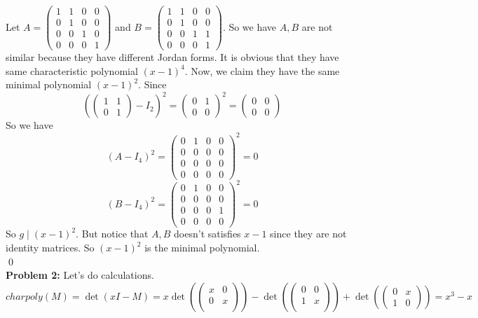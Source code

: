 \documentclass[12pt]{amsart}
\begin{document}
Let $A=\begin{pmatrix}
    1&1&0&0\\
    0&1&0&0\\
    0&0&1&0\\
    0&0&0&1
\end{pmatrix}$ and $B=\begin{pmatrix}
    1&1&0&0\\
    0&1&0&0\\
    0&0&1&1\\
    0&0&0&1
\end{pmatrix}$. So we have $A,B$ are not similar because they have different Jordan forms. It is obvious that they have same characteristic polynomial $(x-1)^4$. Now, we claim they have the same minimal polynomial $(x-1)^2$.
Since $$(\begin{pmatrix}
    1 &1\\
    0&1
\end{pmatrix}-I_2)^2=\begin{pmatrix}
    0&1\\
    0&0
\end{pmatrix}^2=\begin{pmatrix}
    0&0\\
    0&0
\end{pmatrix}$$
So we have 
\[(A-I_4)^2=\begin{pmatrix}
    0&1&0&0\\0&0&0&0\\0&0&0&0\\0&0&0&0
\end{pmatrix}^2=0\]
\[(B-I_4)^2=\begin{pmatrix}
    0&1&0&0\\0&0&0&0\\0&0&0&1\\0&0&0&0
\end{pmatrix}^2=0\]
So $g\mid (x-1)^2$. But notice that $A,B$ doesn't satisfies $x-1$ since they are not identity matrices. So $(x-1)^2$ is the minimal polynomial.\\\qed\\
\textbf{Problem 2:} Let's do calculations.
\[charpoly(M)=\det(xI-M)=x\det(\begin{pmatrix}
    x&0\\
    0&x\\
\end{pmatrix})-\det(\begin{pmatrix}
    0&0\\
    1&x\\
\end{pmatrix})+\det(\begin{pmatrix}
    0&x\\
    1&0
\end{pmatrix})=x^3-x\]
\end{document}
